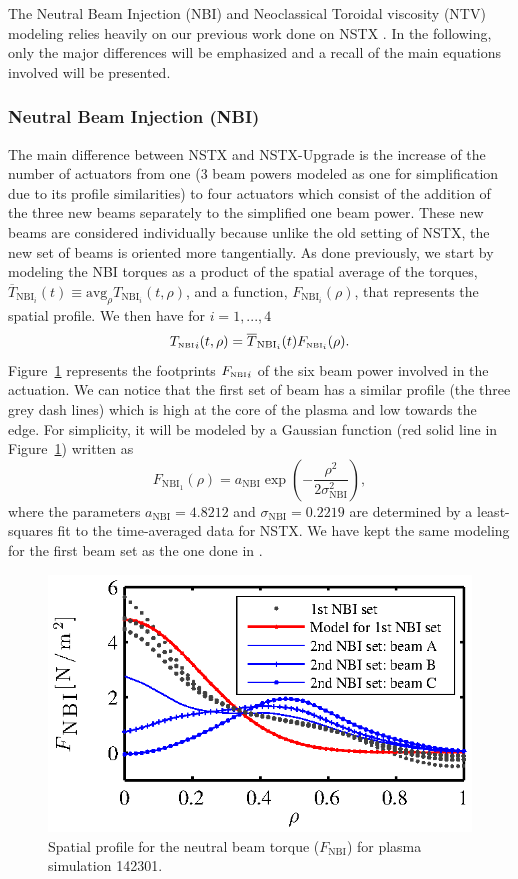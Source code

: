 \documentclass[12pt,lot, lof]{puthesis}
\begin{document}
The Neutral Beam Injection (NBI) and Neoclassical Toroidal viscosity (NTV) modeling relies heavily on our previous work done on NSTX \cite{Goumiri15}. In the following, only the major differences will be emphasized and a recall of the main equations involved will be presented.

\subsubsection{Neutral Beam Injection (NBI)}
 \label{NBIAM}
 The main difference between NSTX and NSTX-Upgrade is the increase of the number of actuators from one (3 beam powers modeled as one for simplification due to its profile similarities) to four actuators which consist of the addition of the three new beams separately to the simplified one beam power. These new beams are considered individually because unlike the old setting of NSTX, the new set of beams is oriented more tangentially. As done previously, we start by modeling the NBI torques as a product of the spatial average of the torques, $\overline{T}_{\text{NBI}_{i}}(t) \equiv \text{avg}_\rho T_{\text{NBI}_i}(t,\rho)$, and a function, $F_{\text{NBI}_i}(\rho)$, that represents the spatial profile.
We then have for $i=1,...,4$  
\begin{equation}
{T_\textrm{\tiny{NBI}}}_i(t,\rho) = \overline{T}_{\text{NBI}_{i}}(t) F_{{\textrm{\tiny{NBI}}}_i}(\rho).
\label{eqn18}
\end{equation}
Figure~{\ref{NBI1}} represents the footprints ${F_\textrm{\tiny{NBI}}}_i$ of the six beam power involved in the actuation. We can notice that the first set of beam has a similar profile (the three grey dash lines) which is high at the core of the plasma and low towards the edge. For simplicity, it will be modeled by a Gaussian function (red solid line in Figure~{\ref{NBI1}}) written as
\begin{equation}
F_{\text{NBI}_1}(\rho) = a_\text{NBI} \exp\left( - \frac{\rho^2}{2\sigma^2_\text{NBI}}\right),
\label{eq6}
\end{equation}    
where the parameters $a_\text{NBI} = 4.8212$ and $\sigma_\text{NBI} =0.2219$ are determined by a least-squares fit to the time-averaged data for NSTX. We have kept the same modeling for the first beam set as the one done in \cite{Goumiri15}. 
\begin{figure} 
\centering
\includegraphics [width=0.8 \linewidth]{chap10/fig4} 
\caption{Spatial profile for the neutral beam torque ($F_\text{NBI} $) for
  plasma simulation 142301. }
\label{NBI1}
\end{figure}   
\end{document}
